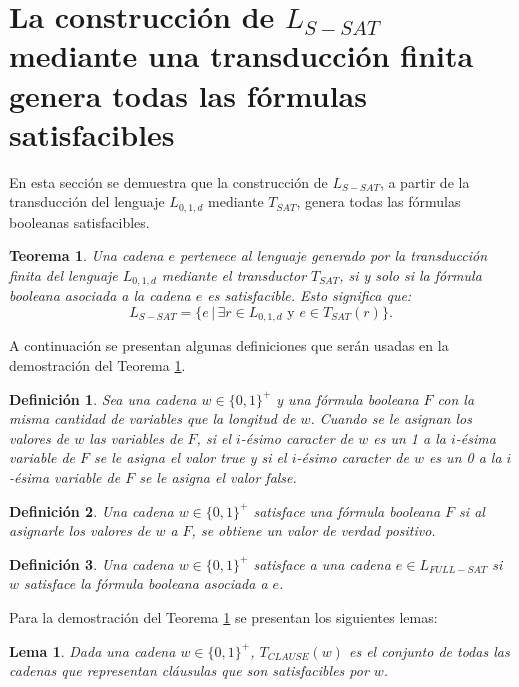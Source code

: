 \documentclass[12pt]{article}
\newtheorem{theorem}{Teorema}
\newtheorem{lemma}{Lema}
\newtheorem{definition}{Definición}
\newcommand{\true}{\textit{true}}
\newcommand{\false}{\textit{false}}
\begin{document}
\section{La construcción de $L_{S-SAT}$ mediante una transducción finita
  genera todas las fórmulas satisfacibles}


En esta sección se demuestra que la construcción de $L_{S-SAT}$, a partir de la transducción del lenguaje $L_{0,1,d}$ mediante $T_{SAT}$, genera todas las fórmulas booleanas satisfacibles.

\begin{theorem}
    \label{teo:tsat}
    Una cadena $e$ pertenece al lenguaje generado por la transducción finita del lenguaje $L_{0,1,d}$ mediante el transductor $T_{SAT}$, si y solo si la fórmula booleana asociada a la cadena $e$ es satisfacible. Esto significa que:
    $$L_{S-SAT} = \{e\,|\,\exists r \in L_{0,1,d} \text{ y } e \in T_{SAT}(r) \}.$$
\end{theorem}

A continuación se presentan algunas definiciones que serán usadas en la demostración del Teorema \ref{teo:tsat}.


\begin{definition}
    Sea una cadena $w\in \{0,1\}^+$ y una fórmula booleana $F$ con la misma cantidad de variables que la longitud de 
    $w$. Cuando se le asignan los valores de $w$ las variables de $F$, si el $i$-ésimo caracter de $w$ es un 1 a la $i$-ésima variable de $F$ se le asigna
    el valor \true{} y si el $i$-ésimo caracter de $w$ es un 0 a la $i$-ésima variable de $F$ se le asigna
    el valor \false{}.
\end{definition}

\begin{definition}
    Una cadena  $w\in\{0,1\}^+$ satisface una fórmula booleana $F$ si al asignarle los valores de $w$ a $F$, se obtiene un valor de verdad positivo.
\end{definition}

\begin{definition}
    Una cadena $w\in\{0,1\}^+$ satisface a una cadena $e\in L_{FULL-SAT}$ si $w$ satisface la fórmula booleana asociada a $e$. 
\end{definition}

Para la demostración del Teorema \ref{teo:tsat} se presentan los siguientes lemas:

\begin{lemma}
    \label{lem:clause}
    Dada una cadena $w\in\{0,1\}^+$, $T_{CLAUSE}(w)$ es el conjunto de todas las cadenas que representan cláusulas que son satisfacibles por $w$.
\end{lemma}
\end{document}
